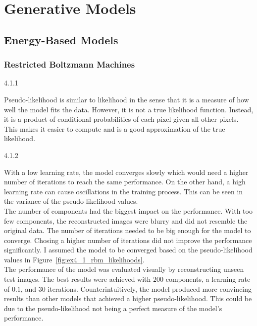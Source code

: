

\vspace*{0.5cm}
\section{Generative Models}
\label{ex:4}


\subsection{Energy-Based Models}
\label{ex:4.1}

\subsubsection*{Restricted Boltzmann Machines}

\begin{task}{4.1.1}
\end{task}

Pseudo-likelihood is similar to likelihood in the sense that it is a measure of how well the model
fits the data. However, it is not a true likelihood function. Instead, it is a product of
conditional probabilities of each pixel given all other pixels. This makes it easier to compute and
is a good approximation of the true likelihood.



\begin{task}{4.1.2}
\end{task}

With a low learning rate, the model converges slowly which would need a higher number of iterations
to reach the same performance. On the other hand, a high learning rate can cause oscillations in the
training process. This can be seen in the variance of the pseudo-likelihood values.\\
The number of components had the biggest impact on the performance. With too few components, the
reconstructed images were blurry and did not resemble the original data. The number of iterations
needed to be big enough for the model to converge. Chosing a higher number of iterations did not
improve the performance significantly. I assumed the model to be converged based on the
pseudo-likelihood values in Figure~\ref{fig:ex4_1_rbm_likelihoods}.\\
The performance of the model was evaluated visually by reconstructing unseen test images. The best
results were achieved with $200$ components, a learning rate of $0.1$, and $30$ iterations.
Counterintuitively, the model produced more convincing results than other models that achieved a
higher pseudo-likelihood. This could be due to the pseudo-likelihood not being a perfect measure of
the model's performance.

